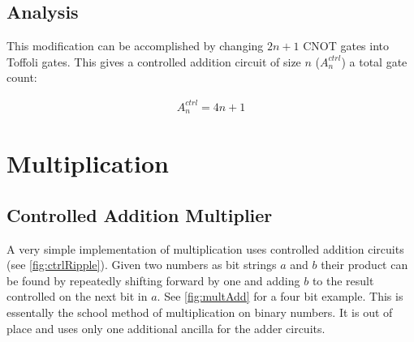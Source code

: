     \subsection{Analysis}

      This modification can be accomplished by changing $2n+1$ CNOT gates into
      Toffoli gates.  This gives a controlled addition circuit of size $n$
      ($A^{ctrl}_n$) a total gate count:

      \begin{align} \label{eq:cadd}
        A^{ctrl}_n = 4n+1
      \end{align}


\section{Multiplication}
  \subsection{Controlled Addition Multiplier}

    A very simple implementation of multiplication uses controlled addition
    circuits (see \cref{fig:ctrlRipple}).  Given two numbers as bit strings $a$
    and $b$ their product can be found by repeatedly shifting forward by one
    and adding $b$ to the result controlled on the next bit in $a$.  See
    \cref{fig:multAdd} for a four bit example. This is essentally the school
    method of multiplication on binary numbers. It is out of place and uses
    only one additional ancilla for the adder circuits.

